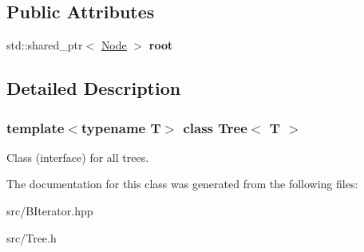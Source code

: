 \subsection*{Public Attributes}
\begin{DoxyCompactItemize}
\item 
\mbox{\label{classTree_a32eaa5ce266bb8896b57fb5527b6c8e9}} 
std\+::shared\+\_\+ptr$<$ \hyperlink{classTree_1_1Node}{Node} $>$ {\bfseries root}
\end{DoxyCompactItemize}


\subsection{Detailed Description}
\subsubsection*{template$<$typename T$>$\newline
class Tree$<$ T $>$}

Class (interface) for all trees. 

The documentation for this class was generated from the following files\+:\begin{DoxyCompactItemize}
\item 
src/B\+Iterator.\+hpp\item 
src/Tree.\+h\end{DoxyCompactItemize}
